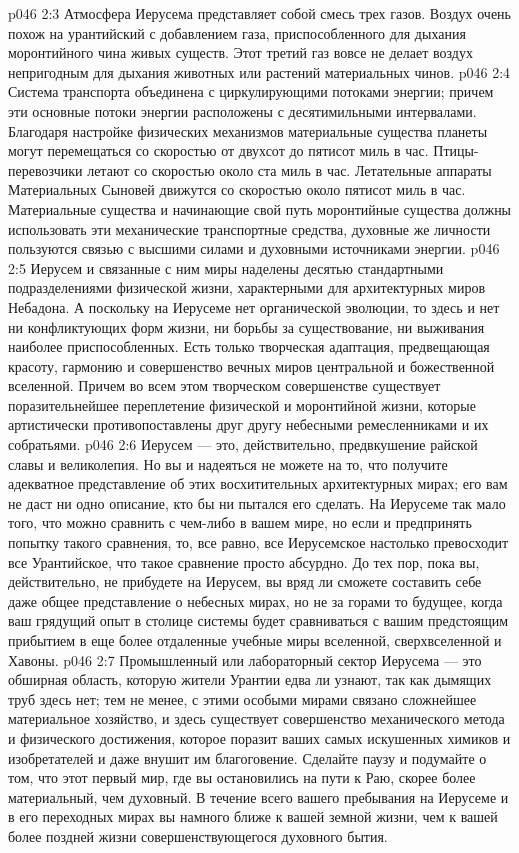 \vs p046 2:3 Атмосфера Иерусема представляет собой смесь трех газов. Воздух очень похож на урантийский с добавлением газа, приспособленного для дыхания моронтийного чина живых существ. Этот третий газ вовсе не делает воздух непригодным для дыхания животных или растений материальных чинов.
\vs p046 2:4 Система транспорта объединена с циркулирующими потоками энергии; причем эти основные потоки энергии расположены с десятимильными интервалами. Благодаря настройке физических механизмов материальные существа планеты могут перемещаться со скоростью от двухсот до пятисот миль в час. Птицы\hyp{}перевозчики летают со скоростью около ста миль в час. Летательные аппараты Материальных Сыновей движутся со скоростью около пятисот миль в час. Материальные существа и начинающие свой путь моронтийные существа должны использовать эти механические транспортные средства, духовные же личности пользуются связью с высшими силами и духовными источниками энергии.
\vs p046 2:5 \pc Иерусем и связанные с ним миры наделены десятью стандартными подразделениями физической жизни, характерными для архитектурных миров Небадона. А поскольку на Иерусеме нет органической эволюции, то здесь и нет ни конфликтующих форм жизни, ни борьбы за существование, ни выживания наиболее приспособленных. Есть только творческая адаптация, предвещающая красоту, гармонию и совершенство вечных миров центральной и божественной вселенной. Причем во всем этом творческом совершенстве существует поразительнейшее переплетение физической и моронтийной жизни, которые артистически противопоставлены друг другу небесными ремесленниками и их собратьями.
\vs p046 2:6 Иерусем --- это, действительно, предвкушение райской славы и великолепия. Но вы и надеяться не можете на то, что получите адекватное представление об этих восхитительных архитектурных мирах; его вам не даст ни одно описание, кто бы ни пытался его сделать. На Иерусеме так мало того, что можно сравнить с чем\hyp{}либо в вашем мире, но если и предпринять попытку такого сравнения, то, все равно, все Иерусемское настолько превосходит все Урантийское, что такое сравнение просто абсурдно. До тех пор, пока вы, действительно, не прибудете на Иерусем, вы вряд ли сможете составить себе даже общее представление о небесных мирах, но не за горами то будущее, когда ваш грядущий опыт в столице системы будет сравниваться с вашим предстоящим прибытием в еще более отдаленные учебные миры вселенной, сверхвселенной и Хавоны.
\vs p046 2:7 \pc Промышленный или лабораторный сектор Иерусема --- это обширная область, которую жители Урантии едва ли узнают, так как дымящих труб здесь нет; тем не менее, с этими особыми мирами связано сложнейшее материальное хозяйство, и здесь существует совершенство механического метода и физического достижения, которое поразит ваших самых искушенных химиков и изобретателей и даже внушит им благоговение. Сделайте паузу и подумайте о том, что этот первый мир, где вы остановились на пути к Раю, скорее более материальный, чем духовный. В течение всего вашего пребывания на Иерусеме и в его переходных мирах вы намного ближе к вашей земной жизни, чем к вашей более поздней жизни совершенствующегося духовного бытия.

